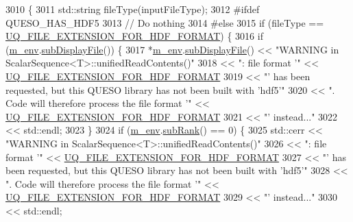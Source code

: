 \begin{DoxyCode}
3010 \{
3011   std::string fileType(inputFileType);
3012 \textcolor{preprocessor}{#ifdef QUESO\_HAS\_HDF5}
3013 \textcolor{preprocessor}{}  \textcolor{comment}{// Do nothing}
3014 \textcolor{preprocessor}{#else}
3015 \textcolor{preprocessor}{}  \textcolor{keywordflow}{if} (fileType == \hyperlink{_defines_8h_a4ebcc075277d031eb97c90b9a45f4493}{UQ\_FILE\_EXTENSION\_FOR\_HDF\_FORMAT}) \{
3016     \textcolor{keywordflow}{if} (\hyperlink{class_q_u_e_s_o_1_1_scalar_sequence_a71618cd6351b29361b437af68447a4c8}{m\_env}.\hyperlink{class_q_u_e_s_o_1_1_base_environment_a8a0064746ae8dddfece4229b9ad374d6}{subDisplayFile}()) \{
3017       *\hyperlink{class_q_u_e_s_o_1_1_scalar_sequence_a71618cd6351b29361b437af68447a4c8}{m\_env}.\hyperlink{class_q_u_e_s_o_1_1_base_environment_a8a0064746ae8dddfece4229b9ad374d6}{subDisplayFile}() << \textcolor{stringliteral}{"WARNING in ScalarSequence<T>::unifiedReadContents()"}
3018                               << \textcolor{stringliteral}{": file format '"} << 
      \hyperlink{_defines_8h_a4ebcc075277d031eb97c90b9a45f4493}{UQ\_FILE\_EXTENSION\_FOR\_HDF\_FORMAT}
3019                               << \textcolor{stringliteral}{"' has been requested, but this QUESO library has not been built with
       'hdf5'"}
3020                               << \textcolor{stringliteral}{". Code will therefore process the file format '"} << 
      \hyperlink{_defines_8h_a4ebcc075277d031eb97c90b9a45f4493}{UQ\_FILE\_EXTENSION\_FOR\_HDF\_FORMAT}
3021                               << \textcolor{stringliteral}{"' instead..."}
3022                               << std::endl;
3023     \}
3024     \textcolor{keywordflow}{if} (\hyperlink{class_q_u_e_s_o_1_1_scalar_sequence_a71618cd6351b29361b437af68447a4c8}{m\_env}.\hyperlink{class_q_u_e_s_o_1_1_base_environment_a172d52f993f1322ed45aaddf71518dbb}{subRank}() == 0) \{
3025       std::cerr << \textcolor{stringliteral}{"WARNING in ScalarSequence<T>::unifiedReadContents()"}
3026                 << \textcolor{stringliteral}{": file format '"} << \hyperlink{_defines_8h_a4ebcc075277d031eb97c90b9a45f4493}{UQ\_FILE\_EXTENSION\_FOR\_HDF\_FORMAT}
3027                 << \textcolor{stringliteral}{"' has been requested, but this QUESO library has not been built with 'hdf5'"}
3028                 << \textcolor{stringliteral}{". Code will therefore process the file format '"} << 
      \hyperlink{_defines_8h_a4ebcc075277d031eb97c90b9a45f4493}{UQ\_FILE\_EXTENSION\_FOR\_HDF\_FORMAT}
3029                 << \textcolor{stringliteral}{"' instead..."}
3030                 << std::endl;

\end{DoxyCode}
